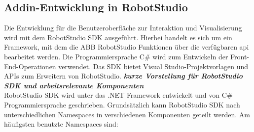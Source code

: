 \documentclass[14pt,a4paper,titlepage]{article}
\begin{document}
		\subsection{Addin-Entwicklung in RobotStudio}
			Die Entwicklung für die Benutzeroberfläche zur Interaktion und Visualisierung wird mit dem RobotStudio SDK ausgeführt. Hierbei handelt es sich um ein Framework, mit dem die ABB RobotStudio Funktionen über die verfügbaren \ac{api} bearbeitet werden. Die Programmiersprache C\# wird zum Entwickeln der Front-End-Operationen verwendet. 
			Das SDK bietet Visual Studio-Projektvorlagen und APIs zum Erweitern von RobotStudio.
			\bigbreak
			\textbf{\emph{kurze Vorstellung für RobotStudio SDK und arbeitsrelevante Komponenten}}
			\\
			RobotStudio SDK wird unter das .NET Framework entwickelt und von C\# Programmiersprache geschrieben.  Grundsätzlich kann RobotStudio SDK nach unterschiedlichen Namespaces in verschiedenen Komponenten geteilt werden. Am häufigsten benutzte Namespaces sind:
\end{document}
